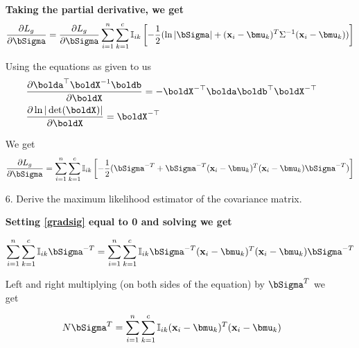 \documentclass[submit]{harvardml}
\newenvironment{answer}{%
    \color{answergreen}\bf}
  {%
  }
\begin{document}
\begin{enumerate}
\begin{answer}
        Taking the partial derivative, we get 
        \begin{equation}
        \frac{\partial L_g}{\partial \bSigma} = 
             \frac{\partial L_g}{\partial \bSigma} 
            \sum_{i=1}^n \sum_{k=1}^c \mBI \left[ 
            -\frac{1}{2} (
                \ln|\bSigma|+(\bx_i-\bmu_k)^T\Sigma^{-1} (\bx_i-\bmu_k) )
                \right] 
        \end{equation}

        Using the equations as given to us
    \begin{align*}
      & \frac{\partial \bolda^\top \boldX^{-1} \boldb}{\partial \boldX} = - \boldX^{-\top} \bolda \boldb^\top \boldX^{-\top} \\
      & \frac{\partial \ln | \det (\boldX) |}{\partial \boldX} = \boldX^{-\top}
     \end{align*}

     We get 
        \begin{equation}
        \frac{\partial L_g}{\partial \bSigma} = 
            \sum_{i=1}^n \sum_{k=1}^c \mBI \left[ 
            -\frac{1}{2} (
            \bSigma^{-T} + \bSigma^{-T} (\bx_i - \bmu_k)^T (\bx_i - \bmu_k)
            \bSigma^{-T} )
                \right]  \label{gradsig}
        \end{equation}

 \end{answer}
  \item[6.] Derive the maximum likelihood estimator of the covariance matrix.

      \begin{answer}
      Setting  \eqref{gradsig} equal to 0 and solving we get 

        \begin{equation}
            \sum_{i=1}^n \sum_{k=1}^c \mBI \bSigma^{-T} =
            \sum_{i=1}^n \sum_{k=1}^c \mBI \bSigma^{-T} (\bx_i - \bmu_k)^T (\bx_i - \bmu_k)
            \bSigma^{-T} 
        \end{equation}

        Left and right multiplying (on both sides of the equation) by
        $\bSigma^{T}$ we get 

        $$
          N \bSigma ^T =  
            \sum_{i=1}^n \sum_{k=1}^c \mBI (\bx_i - \bmu_k)^T (\bx_i - \bmu_k)
            $$


\end{answer}
\end{enumerate}
\end{document}
